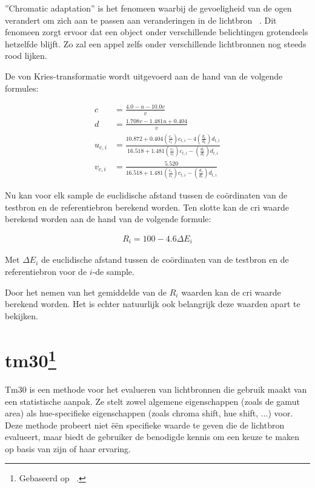 ''Chromatic adaptation'' is het fenomeen waarbij de gevoeligheid van de ogen verandert om zich aan te passen aan veranderingen in de lichtbron ~\cite{ChromaticAdaptation2023,LightingTechnologyHandbook}. Dit fenomeen zorgt ervoor dat een object onder verschillende belichtingen grotendeels hetzelfde blijft. Zo zal een appel zelfs onder verschillende lichtbronnen nog steeds rood lijken.

De von Kries-transformatie wordt uitgevoerd aan de hand van de volgende formules:

\begin{align}
    c &= \frac{4.0 - u - 10.0v}{v} \\
    d &= \frac{1.708v - 1.481u + 0.404}{v}\\
    u_{c,i} &= \frac{10.872 + 0.404\left(\frac{c_r}{c_t}\right)c_{t,i} - 4\left(\frac{d_r}{d_t}\right)d_{t,i}}{16.518 + 1.481\left(\frac{c_r}{c_t}\right)c_{t,i} - \left(\frac{d_r}{d_t}\right)d_{t,i}} \\
    v_{c,i} &= \frac{5.520}{16.518 + 1.481\left(\frac{c_r}{c_t}\right)c_{t,i} - \left(\frac{d_r}{d_t}\right)d_{t,i}}
\end{align}

Nu kan voor elk sample de euclidische afstand tussen de co\"ordinaten van de testbron en de referentiebron berekend worden. Ten slotte kan de \gls{cri} waarde berekend worden aan de hand van de volgende formule:

\begin{align}
    R_i = 100 - 4.6\Delta E_i
\end{align}

Met $\Delta E_i$ de euclidische afstand tussen de co\"ordinaten van de testbron en de referentiebron voor de $i$-de sample.

Door het nemen van het gemiddelde van de $R_i$ waarden kan de \gls{cri} waarde berekend worden. Het is echter natuurlijk ook belangrijk deze waarden apart te bekijken.

\section[tm30]{tm30\texorpdfstring{\footnote{Gebaseerd op ~\cite{david2018}.}}{}}


Tm30 is een methode voor het evalueren van lichtbronnen die gebruik maakt van een statistische aanpak. Ze stelt zowel algemene eigenschappen (zoals de gamut area) als hue-specifieke eigenschappen (zoals chroma shift, hue shift, ...) voor. Deze methode probeert niet \"e\"en specifieke waarde te geven die de lichtbron evalueert, maar biedt de gebruiker de benodigde kennis om een keuze te maken op basis van zijn of haar ervaring.

